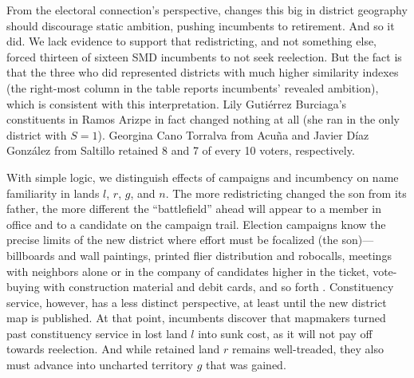 \documentclass[letter,12pt]{article}
\begin{document}
From the electoral connection's perspective, changes this big in district geography should discourage static ambition, pushing incumbents to retirement. And so it did. We lack evidence to support that redistricting, and not something else, forced thirteen of sixteen SMD incumbents to not seek reelection. But the fact is that the three who did represented districts with much higher similarity indexes (the right-most column in the table reports incumbents' revealed ambition), which is consistent with this interpretation. Lily Gutiérrez Burciaga's constituents in Ramos Arizpe in fact changed nothing at all (she ran in the only district with $S=1$). Georgina Cano Torralva from Acuña and Javier Díaz González from Saltillo retained 8 and 7 of every 10 voters, respectively.

With simple logic, we distinguish effects of campaigns and incumbency on name familiarity in lands $l$, $r$, $g$, and $n$. The more redistricting changed the son from its father, the more different the ``battlefield'' ahead will appear to a member in office and to a candidate on the campaign trail. Election campaigns know the precise limits of the new district where effort must be focalized (the son)---billboards and wall paintings, printed flier distribution and robocalls, meetings with neighbors alone or in the company of candidates higher in the ticket, vote-buying with construction material and debit cards, and so forth \citep{langston.nd}. Constituency service, however, has a less distinct perspective, at least until the new district map is published. At that point, incumbents discover that mapmakers turned past constituency service in lost land $l$ into sunk cost, as it will not pay off towards reelection. And while retained land $r$ remains well-treaded, they also must advance into uncharted territory $g$ that was gained.
\end{document}
